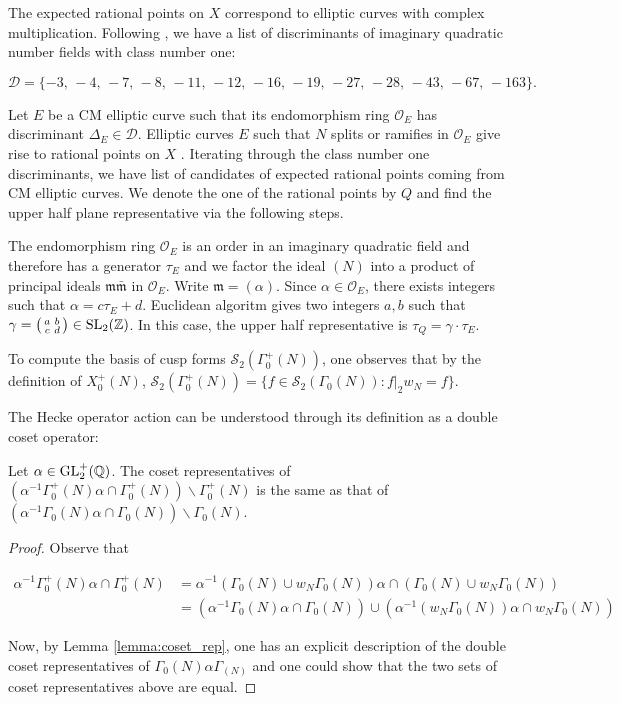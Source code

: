The expected rational points on $X$ correspond to elliptic curves with complex multiplication. Following \cite{Mercuri_2018,stark_classnumber1}, we have a list of discriminants of imaginary quadratic number fields with class number one:

\[
\mathcal{D} = \{ -3,\,-4,\,-7,\,-8,\,-11,\,-12,\,-16,\,-19,\,-27,\,-28,\,-43,\,-67,\,-163\}.
\]

Let $E$ be a CM elliptic curve such that its endomorphism ring $\mathcal{O}_E$ has discriminant $\Delta_E \in \mathcal{D}$. Elliptic curves $E$ such that $N$ splits or ramifies in $\mathcal{O}_E$ give rise to rational points on $X$ \cite{Galbraith_1999}. Iterating through the class number one discriminants, we have list of candidates of expected rational points coming from CM elliptic curves. We denote the one of the rational points by $Q$ and find the upper half plane representative via the following steps.

The endomorphism ring $\mathcal{O}_E$ is an order in an imaginary quadratic field and therefore has a generator $\tau_E$ and we factor the ideal $(N)$ into a product of principal ideals $\mathfrak{m}\bar{\mathfrak{m}}$ in $\mathcal{O}_E$. Write $\mathfrak{m} = (\alpha)$. Since $\alpha \in \mathcal{O}_E$, there exists integers such that $\alpha = c \tau_E + d$. Euclidean algoritm gives two integers $a,b$ such that $\gamma = \begin{psmallmatrix} a & b \\ c & d \end{psmallmatrix} \in \operatorname{SL}_2(\mathbb{Z})$. In this case, the upper half representative is $\tau_Q = \gamma \cdot \tau_E$.

To compute the basis of cusp forms $\mathcal{S}_2(\Gamma_0^+(N))$, one observes that by the definition of $X_0^+(N)$, $\mathcal{S}_2(\Gamma_0^+(N)) = \{ f \in \mathcal{S}_2(\Gamma_0(N)) : f|_2 w_N = f\}$.

The Hecke operator action can be understood through its definition as a double coset operator:

\begin{lemma}
Let $\alpha \in \operatorname{GL}_2^+(\mathbb{Q})$. The coset representatives of $(\alpha^{-1}\Gamma_0^+(N) \alpha \cap \Gamma_0^+(N))\backslash \Gamma_0^+(N)$ is the same as that of  $(\alpha^{-1}\Gamma_0(N) \alpha \cap \Gamma_0(N))\backslash \Gamma_0(N)$.
\end{lemma}

\begin{proof}
Observe that 

\begin{align*}
    \alpha^{-1}\Gamma_0^+(N)\alpha\cap \Gamma_0^+(N) &= \alpha^{-1}(\Gamma_0(N)\cup w_N\Gamma_0(N))\alpha \cap (\Gamma_0(N)\cup w_N\Gamma_0(N)) \\
    &= (\alpha^{-1}\Gamma_0(N)\alpha \cap \Gamma_0(N))\cup (\alpha^{-1}(w_N\Gamma_0(N))\alpha\cap w_N\Gamma_0(N))
\end{align*}

Now, by Lemma \ref{lemma:coset_rep}, one has an explicit description of the double coset representatives of $\Gamma_0(N)\alpha \Gamma_(N)$ and one could show that the two sets of coset representatives above are equal.
\end{proof}

